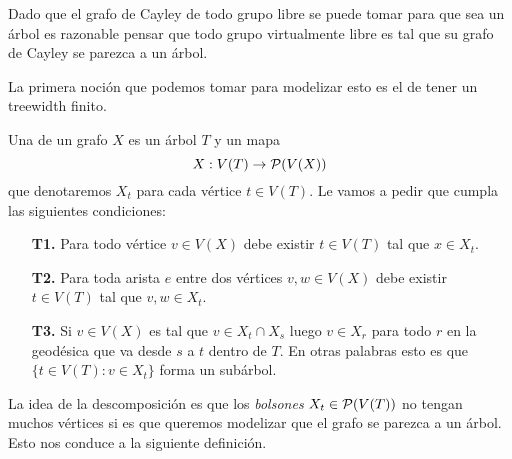 \documentclass[tesis.tex]{subfiles}
\begin{document}
Dado que el grafo de Cayley de todo grupo libre se puede tomar para que sea un árbol es razonable pensar que todo grupo virtualmente libre es tal que su grafo de Cayley se parezca a un árbol. 

La primera noción que podemos tomar para modelizar esto es el de tener un treewidth finito.

\begin{deff}\label{desc-arbol}
	Una  de un grafo $X$ es un árbol $T$ y un mapa 
	\[
	X: V(T) \to {\cal P}(V(X))
	\]
	que denotaremos $X_t$ para cada vértice $t \in V(T)$. 
	Le vamos a pedir que cumpla las siguientes condiciones:
	\begin{enumerate}
		\item[\textbf{T1.}] Para todo vértice $v \in V(X)$ debe existir $t \in V(T)$ tal que $x \in X_t$. 
		\item[\textbf{T2.}] Para toda arista $e$ entre dos vértices $v,w \in V(X)$ debe existir $t \in V(T)$ tal que $v,w \in X_t$.
		\item[\textbf{T3.}] Si $v \in V(X)$ es tal que $v \in X_t \cap X_s$ luego $v \in X_r$ para todo $r$ en la geodésica que va desde $s$ a $t$ dentro de $T$. En otras palabras esto es que $\{ t \in V(T) :  v \in X_t \}$ forma un subárbol. 
	\end{enumerate} 
\end{deff}
\smallskip

La idea de la descomposición es que los \emph{bolsones} $X_t \in {\cal P}(V(T))$ no tengan muchos vértices si es que queremos modelizar que el grafo se parezca a un árbol. Esto nos conduce a la siguiente definición.
\end{document}
